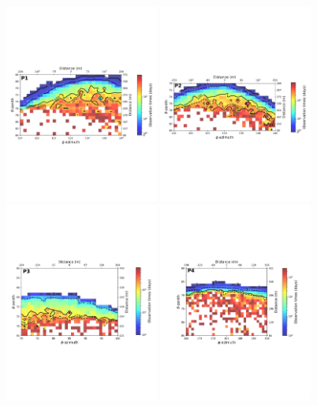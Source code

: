 \documentclass[letterpaper,10pt,titlepage,linenumber]{article}
\begin{document}
\begin{figure}[!ht]
\centering
\includegraphics[width=0.45\textwidth]{Figures/tiempoP1}
\includegraphics[width=0.45\textwidth]{Figures/tiempoP2}\\
\includegraphics[width=0.45\textwidth]{Figures/tiempoP3}
\includegraphics[width=0.45\textwidth]{Figures/tiempoP4}

\end{figure}
\end{document}
